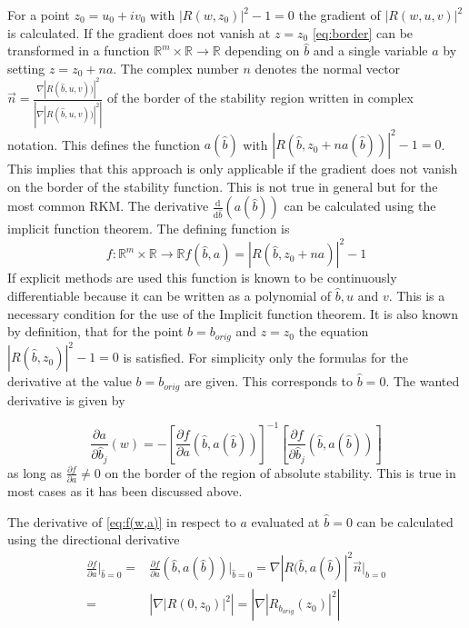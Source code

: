 \documentclass[a4paper]{scrartcl}
\numberwithin{equation}{section}
\theoremstyle{plain}
\theoremstyle{definition}
\numberwithin{theorem}{section}
\newcommand{\R}{\mathbb{R}}
\newcommand{\1}{\mathbbm{1}}
\begin{document}
For a point $z_0= u_0 +i v_0 $ 
with $ |R(w,z_0)|^2 -1 = 0 $ the gradient of
 $|R(w,u,v)|^2$ is calculated. 
If the gradient does not vanish at $z = z_0$ \eqref{eq:border} can be transformed in a function $\R^m \times \R \rightarrow \R$ depending on $\hat{b}$ and a single variable $a$ by setting $z = z_0 + n a$. The complex number $n$ denotes the normal vector $\vec{n} = \frac{\nabla |R(\hat{b},u,v))|^2}{\left| \nabla |R(\hat{b},u,v))|^2 \right|}$ of the border of the stability region written in complex notation. This defines the function $a(\hat{b})$ with $|R(\hat{b},z_0 + n a(\hat{b}))|^2 -1 = 0$. 
This implies that this approach is only applicable if the gradient does not vanish on the border of the stability function. This is not true in general but for the most common RKM. 
The derivative $\frac{\mathrm d}{\mathrm d \hat{b}} (a(\hat{b}))$ can be calculated using the implicit function theorem. The defining function is 
\begin{equation}\label{eq:f(w,a)}
f: \R^m \times \R \rightarrow \R f(\hat{b},a) = |R(\hat{b},z_0 + n a)|^2 -1 
\end{equation}
If explicit methods are used this function is known to be continuously differentiable because it can be written as a polynomial of $\hat{b},u$ and $v$. This is a necessary condition for the use of the Implicit function theorem. 
It is also known by definition, that for the point $b = b_{orig}$ and $z = z_0$ the equation $ |R(\hat{b},z_0)|^2 -1 = 0 $ is satisfied.
For simplicity only the formulas for the derivative at the value $b = b_{orig}$ are given. This corresponds to $\hat{b} = 0$.
The wanted derivative is given by 

\begin{equation}
 \frac{\partial a}{\partial \hat{b}_j} (w) =
 - \left[ \frac{\partial f}{\partial a} (\hat{b},a(\hat{b}))  \right] ^{-1} 
   \left[ \frac{\partial f}{\partial \hat{b}_j}(\hat{b},a(\hat{b})) \right]
\end{equation}
as long as $\frac{\partial f}{\partial a} \neq 0$ on the border of the region of absolute stability. This is true in most cases as it has been discussed above.

The derivative of \eqref{eq:f(w,a)} in respect to $a$ evaluated at $\hat{b}=0$ can be calculated using the directional derivative
\begin{align*}
 \frac{\partial f}{\partial a} \Big|_{\hat{b}=0} =& 
 \frac{\partial f}{\partial a} (\hat{b},a(\hat{b})) \Big|_{\hat{b}=0} = 
 \nabla |R(\hat{b},a(\hat{b})|^2 \vec{n} \Big|_{\hat{b}=0} \\
=& \left| \nabla|R(0,z_0)|^2 \right| = \left| \nabla|R_{b_{orig}}(z_0)|^2 \right|
\end{align*} 
\end{document}

